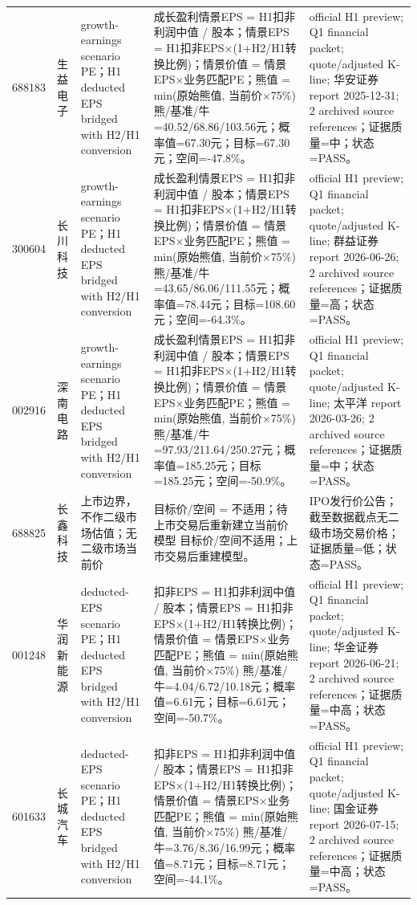 \begin{longtable}{L{0.85cm}L{1.55cm}L{2.25cm}L{6.0cm}L{4.0cm}}
688183 & 生益电子 & growth-earnings scenario PE；H1 deducted EPS bridged with H2/H1 conversion & 成长盈利情景EPS = H1扣非利润中值 / 股本；情景EPS = H1扣非EPS×(1+H2/H1转换比例)；情景价值 = 情景EPS×业务匹配PE；熊值 = min(原始熊值, 当前价×75\%) 熊/基准/牛=40.52/68.86/103.56元；概率值=67.30元；目标=67.30元；空间=-47.8\%。 & official H1 preview; Q1 financial packet; quote/adjusted K-line; 华安证券 report 2025-12-31; 2 archived source references；证据质量=中；状态=PASS。 \\
300604 & 长川科技 & growth-earnings scenario PE；H1 deducted EPS bridged with H2/H1 conversion & 成长盈利情景EPS = H1扣非利润中值 / 股本；情景EPS = H1扣非EPS×(1+H2/H1转换比例)；情景价值 = 情景EPS×业务匹配PE；熊值 = min(原始熊值, 当前价×75\%) 熊/基准/牛=43.65/86.06/111.55元；概率值=78.44元；目标=108.60元；空间=-64.3\%。 & official H1 preview; Q1 financial packet; quote/adjusted K-line; 群益证券 report 2026-06-26; 2 archived source references；证据质量=高；状态=PASS。 \\
002916 & 深南电路 & growth-earnings scenario PE；H1 deducted EPS bridged with H2/H1 conversion & 成长盈利情景EPS = H1扣非利润中值 / 股本；情景EPS = H1扣非EPS×(1+H2/H1转换比例)；情景价值 = 情景EPS×业务匹配PE；熊值 = min(原始熊值, 当前价×75\%) 熊/基准/牛=97.93/211.64/250.27元；概率值=185.25元；目标=185.25元；空间=-50.9\%。 & official H1 preview; Q1 financial packet; quote/adjusted K-line; 太平洋 report 2026-03-26; 2 archived source references；证据质量=中；状态=PASS。 \\
688825 & 长鑫科技 & 上市边界，不作二级市场估值；无二级市场当前价 & 目标价/空间 = 不适用；待上市交易后重新建立当前价模型 目标价/空间不适用；上市交易后重建模型。 & IPO发行价公告；截至数据截点无二级市场交易价格；证据质量=低；状态=PASS。 \\
001248 & 华润新能源 & deducted-EPS scenario PE；H1 deducted EPS bridged with H2/H1 conversion & 扣非EPS = H1扣非利润中值 / 股本；情景EPS = H1扣非EPS×(1+H2/H1转换比例)；情景价值 = 情景EPS×业务匹配PE；熊值 = min(原始熊值, 当前价×75\%) 熊/基准/牛=4.04/6.72/10.18元；概率值=6.61元；目标=6.61元；空间=-50.7\%。 & official H1 preview; Q1 financial packet; quote/adjusted K-line; 华金证券 report 2026-06-21; 2 archived source references；证据质量=中高；状态=PASS。 \\
601633 & 长城汽车 & deducted-EPS scenario PE；H1 deducted EPS bridged with H2/H1 conversion & 扣非EPS = H1扣非利润中值 / 股本；情景EPS = H1扣非EPS×(1+H2/H1转换比例)；情景价值 = 情景EPS×业务匹配PE；熊值 = min(原始熊值, 当前价×75\%) 熊/基准/牛=3.76/8.36/16.99元；概率值=8.71元；目标=8.71元；空间=-44.1\%。 & official H1 preview; Q1 financial packet; quote/adjusted K-line; 国金证券 report 2026-07-15; 2 archived source references；证据质量=中高；状态=PASS。 \\

\end{longtable}
